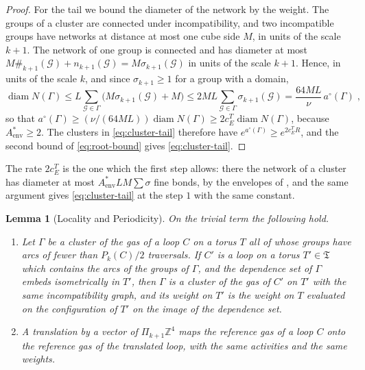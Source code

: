\documentclass[11pt]{preprint}
\newcommand{\diam}{\operatorname{diam}}
\numberwithin{equation}{section}
\newtheorem{lemma}[theorem]{Lemma}
\theoremstyle{definition}
\theoremstyle{remark}
\theoremstyle{plain}
\begin{document}
\begin{proof}
For the tail we bound the diameter of the network by the weight. The groups of a cluster are connected under incompatibility, and two incompatible groups have networks at distance at most one cube side $M$, in units of the scale $k + 1$. The network of one group is connected and has diameter at most $M\#_{k+1}(\mathcal G) + n_{k+1}(\mathcal G) = M\sigma_{k+1}(\mathcal G)$ in units of the scale $k + 1$. Hence, in units of the scale $k$, and since $\sigma_{k+1} \geq 1$ for a group with a domain,
\begin{equation}\label{eq:network-diameter}
    \diam N(\Gamma) \leq L\sum_{\mathcal G \in \Gamma}\bigl(M\sigma_{k+1}(\mathcal G) + M\bigr) \leq 2ML\sum_{\mathcal G \in \Gamma}\sigma_{k+1}(\mathcal G) = \frac{64ML}{\nu}\,a^\circ(\Gamma)\;,
\end{equation}
so that $a^\circ(\Gamma) \geq (\nu/(64ML))\diam N(\Gamma) \geq 2c^T_E\diam N(\Gamma)$, because $A^*_{\mathrm{env}} \geq 2$. The clusters in \eqref{eq:cluster-tail} therefore have $e^{a^\circ(\Gamma)} \geq e^{2c^T_ER}$, and the second bound of \eqref{eq:root-bound} gives \eqref{eq:cluster-tail}.
\end{proof}

The rate $2c^T_E$ is the one which the first step allows: there the network of a cluster has diameter at most $A^*_{\mathrm{env}}LM\sum\sigma$ fine bonds, by the envelopes of \cite[Lemma~E.8]{WilsonFirstStep}, and the same argument gives \eqref{eq:cluster-tail} at the step $1$ with the same constant.

\begin{lemma}[Locality and Periodicity]\label{lem:locality}
On the trivial term the following hold.
\begin{enumerate}[label=(\roman*)]
\item Let $\Gamma$ be a cluster of the gas of a loop $C$ on a torus $T$ all of whose groups have arcs of fewer than $P_k(C)/2$ traversals. If $C'$ is a loop on a torus $T' \in \mathfrak T$ which contains the arcs of the groups of $\Gamma$, and the dependence set of $\Gamma$ embeds isometrically in $T'$, then $\Gamma$ is a cluster of the gas of $C'$ on $T'$ with the same incompatibility graph, and its weight on $T'$ is the weight on $T$ evaluated on the configuration of $T'$ on the image of the dependence set.
\item A translation by a vector of $\Pi_{k+1}\mathbb Z^4$ maps the reference gas of a loop $C$ onto the reference gas of the translated loop, with the same activities and the same weights.
\end{enumerate}
\end{lemma}
\end{document}
